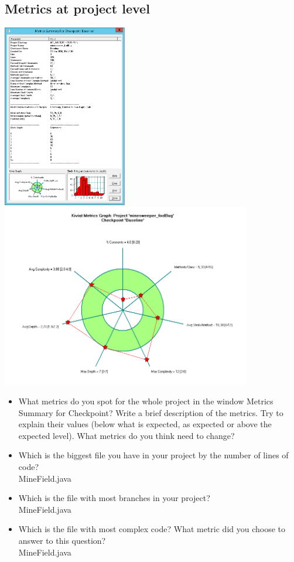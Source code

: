 \documentclass[UKenglish]{article}  %
\begin{document}
\subsection{Metrics at project level}
\includegraphics[height=8cm]{metric_summary}
\includegraphics[height=8cm]{kiviat_diagram_baseline}
\begin{itemize}
\item What metrics do you spot for the whole project in the window Metrics Summary for Checkpoint? Write a brief description of the metrics. Try to explain their values (below what is expected, as expected or above the expected level). What metrics do you think need to change?\\
\item Which is the biggest file you have in your project by the number of lines of code? \\
MineField.java
\item Which is the file with most branches in your project?\\
MineField.java
\item Which is the file with most complex code? What metric did you choose to answer to this question?\\
MineField.java
\end{itemize}
\end{document}
